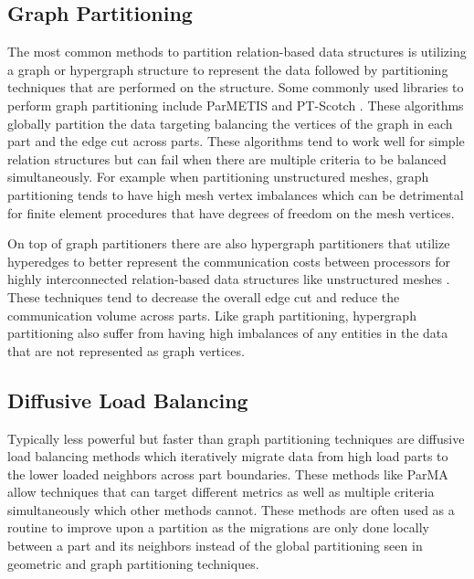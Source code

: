 \documentclass[a4paper]{article}
\begin{document}
\subsection{Graph Partitioning}
The most common methods to partition relation-based data structures is utilizing a graph or hypergraph structure to represent the data followed by partitioning techniques that are performed on the structure. Some commonly used libraries to perform graph partitioning include ParMETIS \cite{parmetis4} and PT-Scotch \cite{scotch2009}. These algorithms globally partition the data targeting balancing the vertices of the graph in each part and the edge cut across parts. These algorithms tend to work well for simple relation structures but can fail when there are multiple criteria to be balanced simultaneously. For example when partitioning unstructured meshes, graph partitioning tends to have high mesh vertex imbalances which can be detrimental for finite element procedures that have degrees of freedom on the mesh vertices. 

On top of graph partitioners there are also hypergraph partitioners that utilize hyperedges to better represent the communication costs between processors for highly interconnected relation-based data structures like unstructured meshes \cite{devine2002zoltan}. These techniques tend to decrease the overall edge cut and reduce the communication volume across parts. Like graph partitioning, hypergraph partitioning also suffer from having high imbalances of any entities in the data that are not represented as graph vertices. 

\subsection{Diffusive Load Balancing}
Typically less powerful but faster than graph partitioning techniques are diffusive load balancing methods which iteratively migrate data from high load parts to the lower loaded neighbors across part boundaries. These methods like ParMA \cite{SmithParma2015} allow techniques that can target different metrics as well as multiple criteria simultaneously which other methods cannot. These methods are often used as a routine to improve upon a partition as the migrations are only done locally between a part and its neighbors instead of the global partitioning seen in geometric and graph partitioning techniques.
\end{document}
